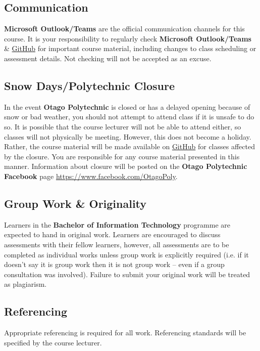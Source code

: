 \documentclass{article}
\begin{document}
\subsection*{Communication}
\textbf{Microsoft Outlook/Teams} are the official communication channels for this course. It is your responsibility to regularly check \textbf{Microsoft Outlook/Teams} \& \href{https://github.com/otago-polytechnic-bit-courses/IN721-mobile-application-development}{GitHub} for important course material, including changes to class scheduling or assessment details. Not checking will not be accepted as an excuse.

\subsection*{Snow Days/Polytechnic Closure}
In the event \textbf{Otago Polytechnic} is closed or has a delayed opening because of snow or bad weather, you should not attempt to attend class if it is unsafe to do so. It is possible that the course lecturer will not be able to attend either, so classes will not physically be meeting. However, this does not become a holiday. Rather, the course material will be made available on \href{https://github.com/otago-polytechnic-bit-courses/IN721-mobile-application-development}{GitHub} for classes affected by the closure. You are responsible for any course material presented in this manner. Information about closure will be posted on the \textbf{Otago Polytechnic Facebook} page \href{https://www.facebook.com/OtagoPoly}{https://www.facebook.com/OtagoPoly}.

\subsection*{Group Work \& Originality}
Learners in the \textbf{Bachelor of Information Technology} programme are expected to hand in original work. Learners are encouraged to discuss assessments with their fellow learners, however, all assessments are to be completed as individual works unless group work is explicitly required (i.e. if it doesn’t say it is group work then it is not group work – even if a group consultation was involved). Failure to submit your original work will be treated as plagiarism. 

\subsection*{Referencing}
Appropriate referencing is required for all work. Referencing standards will be specified by the course lecturer.
\end{document}
